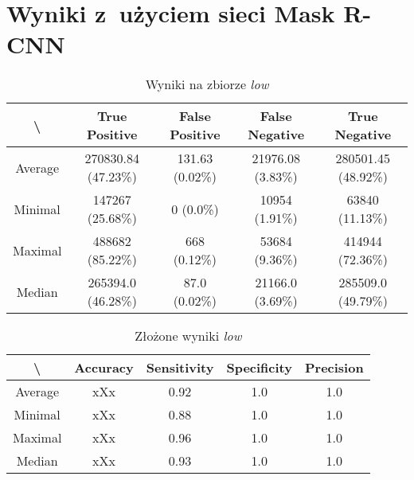 \newpage
\section{Wyniki z~użyciem sieci Mask R-CNN}

\begin{table}[!h]
	\centering
	\caption{Wyniki na zbiorze \textit{low}}
	\vspace{6pt}
	{\footnotesize
		\begin{tabular}{|c|c|c|c|c|}
			\hline \textbackslash & True Positive & False Positive & False Negative & True Negative \\
      \hline Average & 270830.84 (47.23\%) & 131.63 (0.02\%) & 21976.08 (3.83\%) & 280501.45 (48.92\%) \\
      \hline Minimal & 147267 (25.68\%) & 0 (0.0\%) & 10954 (1.91\%) & 63840 (11.13\%) \\
      \hline Maximal & 488682 (85.22\%) & 668 (0.12\%) & 53684 (9.36\%) & 414944 (72.36\%) \\
      \hline Median & 265394.0 (46.28\%) & 87.0 (0.02\%) & 21166.0 (3.69\%) & 285509.0 (49.79\%) \\
      \hline
		\end{tabular}
	}
	\vspace{0pt}
\end{table}

\vspace{1cm}

\begin{table}[!h]
	\centering
	\caption{Złożone wyniki \textit{low}}
	\vspace{6pt}
	{\footnotesize
		\begin{tabular}{|c|c|c|c|c|}
			\hline \textbackslash & Accuracy & Sensitivity & Specificity & Precision \\
      \hline Average & xXx & 0.92 & 1.0 & 1.0 \\
      \hline Minimal & xXx & 0.88 & 1.0 & 1.0 \\
      \hline Maximal & xXx & 0.96 & 1.0 & 1.0 \\
      \hline Median & xXx & 0.93 & 1.0 & 1.0 \\
      \hline
		\end{tabular}
	}
	\vspace{0pt}
\end{table}


